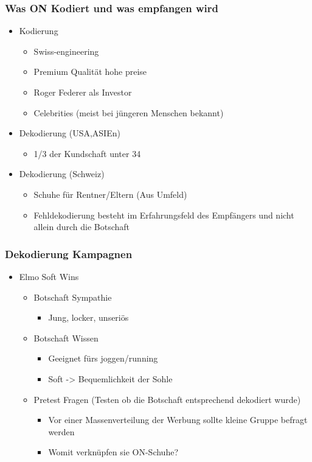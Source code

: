\subsubsection{Was ON Kodiert und was empfangen wird}
\begin{itemize}
    \item Kodierung
    \begin{itemize}
    \item Swiss-engineering 
    \item Premium Qualität hohe preise
    \item Roger Federer als Investor
    \item Celebrities (meist bei jüngeren Menschen bekannt)
\end{itemize}
\item Dekodierung (USA,ASIEn)
\begin{itemize}
    \item 1/3 der Kundschaft unter 34
\end{itemize}
\item Dekodierung (Schweiz)
\begin{itemize}
    \item Schuhe für Rentner/Eltern (Aus Umfeld)
    \item Fehldekodierung besteht im Erfahrungsfeld des Empfängers und nicht allein durch die Botschaft
\end{itemize}
\end{itemize}

\subsubsection{Dekodierung Kampagnen}

\begin{itemize}
    \item Elmo Soft Wins
    \begin{itemize}
        \item Botschaft Sympathie
        \begin{itemize}
            \item Jung, locker, unseriös
        \end{itemize} 
        \item Botschaft Wissen
        \begin{itemize}
            \item Geeignet fürs joggen/running 
            \item Soft -> Bequemlichkeit der Sohle
        \end{itemize}
        \item Pretest Fragen (Testen ob die Botschaft entsprechend dekodiert wurde)
        \begin{itemize}
            \item Vor einer Massenverteilung der Werbung sollte kleine Gruppe befragt werden
            \item Womit verknüpfen sie ON-Schuhe?
        \end{itemize}
    \end{itemize}
\end{itemize}

